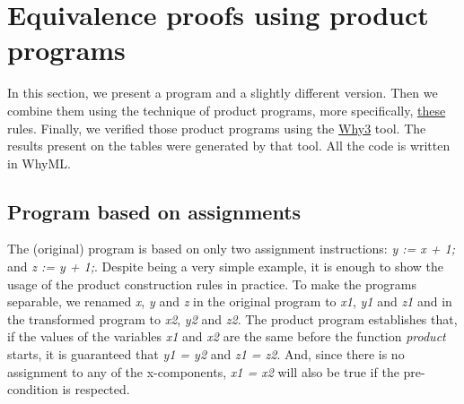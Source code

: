 \section{Equivalence proofs using product programs}
\label{sec:results_eq_proofs_pp}

In this section, we present a program and a slightly different version.
Then we combine them using the technique of product programs, more specifically, \hyperref[fig:product_construction_equal_struct]{these} rules. 
Finally, we verified those product programs using the \hyperref[sec:why3]{Why3} tool.
The results present on the tables were generated by that tool.
All the code is written in WhyML.


\subsection{Program based on assignments}
\label{sub:results_assignments}

The (original) program is based on only two assignment instructions: \emph{y := x + 1;} and \emph{z := y + 1;}.
Despite being a very simple example, it is enough to show the usage of the product construction rules in practice.
To make the programs separable, we renamed \emph{x}, \emph{y} and \emph{z} in the original program to \emph{x1}, \emph{y1} and \emph{z1} and in the transformed program to \emph{x2}, \emph{y2} and \emph{z2}.
The product program establishes that, if the values of the variables \emph{x1} and \emph{x2} are the same before the function \emph{product} starts, it is guaranteed that \emph{y1 = y2} and \emph{z1 = z2}.
And, since there is no assignment to any of the x-components, \emph{x1 = x2} will also be true if the pre-condition is respected.

